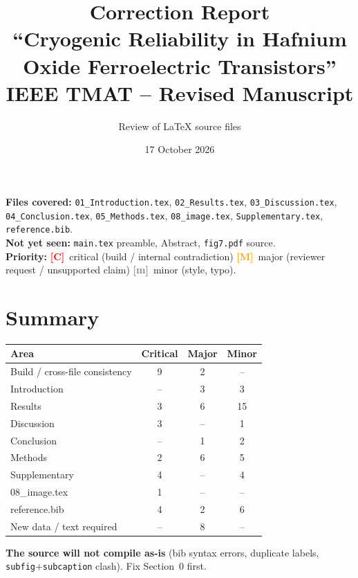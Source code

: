 \documentclass[10pt,a4paper]{article}
\title{Correction Report\\
\large ``Cryogenic Reliability in Hafnium Oxide Ferroelectric Transistors''\\
IEEE TMAT -- Revised Manuscript}
\author{Review of LaTeX source files}
\date{17 October 2026}
\newcommand{\C}{\textcolor{red}{\textbf{[C]}}}
\newcommand{\M}{\textcolor{orange}{\textbf{[M]}}}
\newcommand{\m}{\textcolor{gray}{\textbf{[m]}}}
\begin{document}
\maketitle

\noindent\textbf{Files covered:} \texttt{01\_Introduction.tex}, \texttt{02\_Results.tex}, \texttt{03\_Discussion.tex}, \texttt{04\_Conclusion.tex}, \texttt{05\_Methods.tex}, \texttt{08\_image.tex}, \texttt{Supplementary.tex}, \texttt{reference.bib}.\\
\textbf{Not yet seen:} \texttt{main.tex} preamble, Abstract, \texttt{fig7.pdf} source.\\
\textbf{Priority:} \C\ critical (build / internal contradiction) \quad \M\ major (reviewer request / unsupported claim) \quad \m\ minor (style, typo).

\section*{Summary}
\begin{center}
\begin{tabular}{lccc}
\toprule
Area & Critical & Major & Minor\\
\midrule
Build / cross-file consistency & 9 & 2 & --\\
Introduction & -- & 3 & 3\\
Results & 3 & 6 & 15\\
Discussion & 3 & -- & 1\\
Conclusion & -- & 1 & 2\\
Methods & 2 & 6 & 5\\
Supplementary & 4 & -- & 4\\
08\_image.tex & 1 & -- & --\\
reference.bib & 4 & 2 & 6\\
New data / text required & -- & 8 & --\\
\bottomrule
\end{tabular}
\end{center}
\textbf{The source will not compile as-is} (bib syntax errors, duplicate labels, \texttt{subfig}+\texttt{subcaption} clash). Fix Section~0 first.

\end{document}
